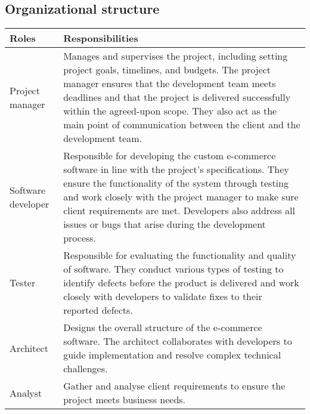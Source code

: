 \subsection{Organizational structure}
\begin{table}[h!]
\centering
\begin{tabular}{|l|p{}|}
\hline
\textbf{Roles} & \textbf{Responsibilities} \\ \hline

Project manager & Manages and supervises the project, including setting project goals, timelines, and budgets. The project manager ensures that the development team meets deadlines and that the project is delivered successfully within the agreed-upon scope. They also act as the main point of communication between the client and the development team. \\ \hline
Software developer & Responsible for developing the custom e-commerce software in line with the project's specifications. They ensure the functionality of the system through testing and work closely with the project manager to make sure client requirements are met. Developers also address all issues or bugs that arise during the development process. \\ \hline
Tester & Responsible for evaluating the functionality and quality of software. They conduct various types of testing to identify defects before the product is delivered and work closely with developers to validate fixes to their reported defects. \\ \hline
Architect & Designs the overall structure of the e-commerce software. The architect collaborates with developers to guide implementation and resolve complex technical challenges. \\ \hline
Analyst &  Gather and analyse client requirements to ensure the project meets business needs.\\ \hline


\end{tabular}
\end{table}


